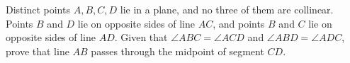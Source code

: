 Distinct points $A,B,C,D$ lie in a plane, and no three of them are collinear. Points $B$ and $D$ lie on opposite sides of line $AC$, and points $B$ and $C$ lie on opposite sides of line $AD$. Given that $\angle ABC=\angle ACD$ and $\angle ABD=\angle ADC$, prove that line $AB$ passes through the midpoint of segment $CD$.
